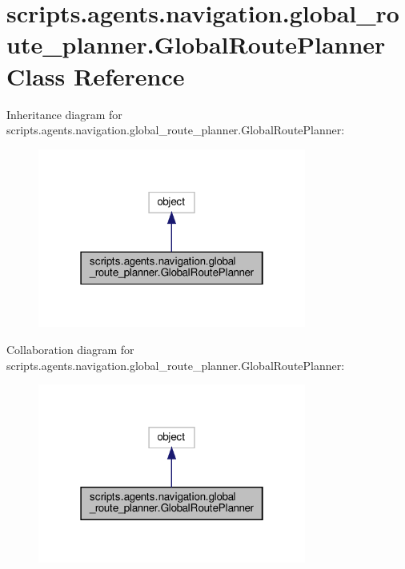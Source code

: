 \hypertarget{classscripts_1_1agents_1_1navigation_1_1global__route__planner_1_1GlobalRoutePlanner}{}\section{scripts.\+agents.\+navigation.\+global\+\_\+route\+\_\+planner.\+Global\+Route\+Planner Class Reference}
\label{classscripts_1_1agents_1_1navigation_1_1global__route__planner_1_1GlobalRoutePlanner}


Inheritance diagram for scripts.\+agents.\+navigation.\+global\+\_\+route\+\_\+planner.\+Global\+Route\+Planner\+:\nopagebreak
\begin{figure}[H]
\begin{center}
\leavevmode
\includegraphics[width=250pt]{d8/d27/classscripts_1_1agents_1_1navigation_1_1global__route__planner_1_1GlobalRoutePlanner__inherit__graph}
\end{center}
\end{figure}


Collaboration diagram for scripts.\+agents.\+navigation.\+global\+\_\+route\+\_\+planner.\+Global\+Route\+Planner\+:\nopagebreak
\begin{figure}[H]
\begin{center}
\leavevmode
\includegraphics[width=250pt]{db/db5/classscripts_1_1agents_1_1navigation_1_1global__route__planner_1_1GlobalRoutePlanner__coll__graph}
\end{center}
\end{figure}
